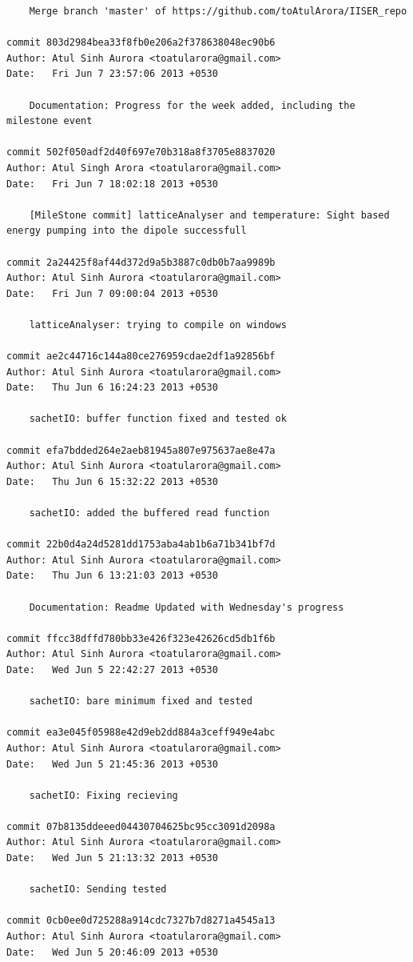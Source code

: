 \begin{lstlisting}
    Merge branch 'master' of https://github.com/toAtulArora/IISER_repo

commit 803d2984bea33f8fb0e206a2f378638048ec90b6
Author: Atul Sinh Aurora <toatularora@gmail.com>
Date:   Fri Jun 7 23:57:06 2013 +0530

    Documentation: Progress for the week added, including the milestone event

commit 502f050adf2d40f697e70b318a8f3705e8837020
Author: Atul Singh Arora <toatularora@gmail.com>
Date:   Fri Jun 7 18:02:18 2013 +0530

    [MileStone commit] latticeAnalyser and temperature: Sight based energy pumping into the dipole successfull

commit 2a24425f8af44d372d9a5b3887c0db0b7aa9989b
Author: Atul Sinh Aurora <toatularora@gmail.com>
Date:   Fri Jun 7 09:00:04 2013 +0530

    latticeAnalyser: trying to compile on windows

commit ae2c44716c144a80ce276959cdae2df1a92856bf
Author: Atul Sinh Aurora <toatularora@gmail.com>
Date:   Thu Jun 6 16:24:23 2013 +0530

    sachetIO: buffer function fixed and tested ok

commit efa7bdded264e2aeb81945a807e975637ae8e47a
Author: Atul Sinh Aurora <toatularora@gmail.com>
Date:   Thu Jun 6 15:32:22 2013 +0530

    sachetIO: added the buffered read function

commit 22b0d4a24d5281dd1753aba4ab1b6a71b341bf7d
Author: Atul Sinh Aurora <toatularora@gmail.com>
Date:   Thu Jun 6 13:21:03 2013 +0530

    Documentation: Readme Updated with Wednesday's progress

commit ffcc38dffd780bb33e426f323e42626cd5db1f6b
Author: Atul Sinh Aurora <toatularora@gmail.com>
Date:   Wed Jun 5 22:42:27 2013 +0530

    sachetIO: bare minimum fixed and tested

commit ea3e045f05988e42d9eb2dd884a3ceff949e4abc
Author: Atul Sinh Aurora <toatularora@gmail.com>
Date:   Wed Jun 5 21:45:36 2013 +0530

    sachetIO: Fixing recieving

commit 07b8135ddeeed04430704625bc95cc3091d2098a
Author: Atul Sinh Aurora <toatularora@gmail.com>
Date:   Wed Jun 5 21:13:32 2013 +0530

    sachetIO: Sending tested

commit 0cb0ee0d725288a914cdc7327b7d8271a4545a13
Author: Atul Sinh Aurora <toatularora@gmail.com>
Date:   Wed Jun 5 20:46:09 2013 +0530


\end{lstlisting}
